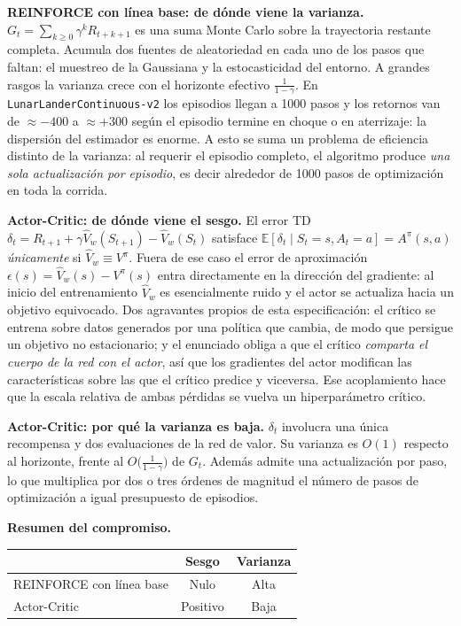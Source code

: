 \documentclass[11pt,letterpaper]{article}
\newcommand{\Esp}{\mathbb{E}}
\newcommand{\lead}[1]{\textbf{#1}}
\begin{document}
\begin{respuesta}
\medskip
\lead{REINFORCE con línea base: de dónde viene la varianza.} $G_t = \sum_{k\ge 0}\gamma^k
R_{t+k+1}$ es una suma Monte Carlo sobre la trayectoria restante completa. Acumula dos
fuentes de aleatoriedad en cada uno de los pasos que faltan: el muestreo de la Gaussiana
y la estocasticidad del entorno. A grandes rasgos la varianza crece con el horizonte
efectivo $\tfrac{1}{1-\gamma}$. En \texttt{LunarLanderContinuous-v2} los episodios llegan
a 1000 pasos y los retornos van de $\approx -400$ a $\approx +300$ según el episodio
termine en choque o en aterrizaje: la dispersión del estimador es enorme. A esto se suma
un problema de eficiencia distinto de la varianza: al requerir el episodio completo, el
algoritmo produce \emph{una sola actualización por episodio}, es decir alrededor de 1000
pasos de optimización en toda la corrida.

\medskip
\lead{Actor-Critic: de dónde viene el sesgo.} El error TD
$\delta_t = R_{t+1}+\gamma\hat{V}_w(S_{t+1})-\hat{V}_w(S_t)$ satisface
$\Esp[\delta_t \mid S_t=s, A_t=a] = A^\pi(s,a)$ \emph{únicamente} si
$\hat{V}_w \equiv V^\pi$. Fuera de ese caso el error de aproximación
$\epsilon(s) = \hat{V}_w(s)-V^\pi(s)$ entra directamente en la dirección del gradiente:
al inicio del entrenamiento $\hat{V}_w$ es esencialmente ruido y el actor se actualiza
hacia un objetivo equivocado. Dos agravantes propios de esta especificación: el crítico
se entrena sobre datos generados por una política que cambia, de modo que persigue un
objetivo no estacionario; y el enunciado obliga a que el crítico \emph{comparta el cuerpo
de la red con el actor}, así que los gradientes del actor modifican las características
sobre las que el crítico predice y viceversa. Ese acoplamiento hace que la escala relativa
de ambas pérdidas se vuelva un hiperparámetro crítico.

\medskip
\lead{Actor-Critic: por qué la varianza es baja.} $\delta_t$ involucra una única
recompensa y dos evaluaciones de la red de valor. Su varianza es $O(1)$ respecto al
horizonte, frente al $O\!\big(\tfrac{1}{1-\gamma}\big)$ de $G_t$. Además admite una
actualización por paso, lo que multiplica por dos o tres órdenes de magnitud el número de
pasos de optimización a igual presupuesto de episodios.

\medskip
\lead{Resumen del compromiso.}
\begin{center}
\begin{tabular}{lcc}
\toprule
 & \textbf{Sesgo} & \textbf{Varianza} \\
\midrule
REINFORCE con línea base & Nulo & Alta \\
Actor-Critic             & Positivo & Baja \\
\bottomrule
\end{tabular}
\end{center}
\end{respuesta}
\end{document}
